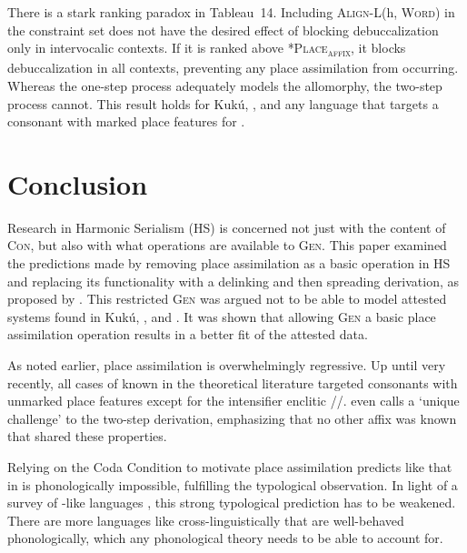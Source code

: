 \documentclass[output=paper,modfonts,nonflat,hidelinks]{langsci/langscibook}
\begin{document}
There is a stark ranking paradox in Tableau~14. Including \textsc{Align-L(}h, \textsc{Word)} in the constraint set does not have the desired effect of blocking debuccalization only in intervocalic contexts. If it is ranked above \textsc{*Place\textsubscript{affix}}, it blocks debuccalization in all contexts, preventing any place assimilation from occurring. Whereas the one-step process adequately models the  allomorphy, the two-step process cannot. This result holds for Kuk\'u, , and any language that targets a consonant with marked place features for .

\section{Conclusion}\label{sec:lamont:4}

Research in Harmonic Serialism (HS) is concerned not just with the content of \textsc{Con}, but also with what operations are available to \textsc{Gen}. This paper examined the predictions made by removing place assimilation as a basic operation in HS and replacing its functionality with a delinking and then spreading derivation, as proposed by \citet{mccarthy2007,mccarthy2008}. This restricted \textsc{Gen} was argued not to be able to model attested  systems found in Kuk\'u, , and . It was shown that allowing \textsc{Gen} a basic place assimilation operation results in a better fit of the attested data.

As noted earlier, place assimilation is overwhelmingly regressive. Up until very recently, all cases of  known in the theoretical literature targeted consonants with unmarked place features except for the  intensifier enclitic //. \citet{mccarthy2007} even calls  a `unique challenge' to the two-step derivation, emphasizing that no other affix was known that shared these properties.

Relying on the Coda Condition to motivate place assimilation predicts  like that in  is phonologically impossible, fulfilling the typological observation. In light of a survey of -like languages \citep{lamont2015}, this strong typological prediction has to be weakened. There are more languages like  cross-linguistically that are well-behaved phonologically, which any phonological theory needs to be able to account for.
\end{document}
